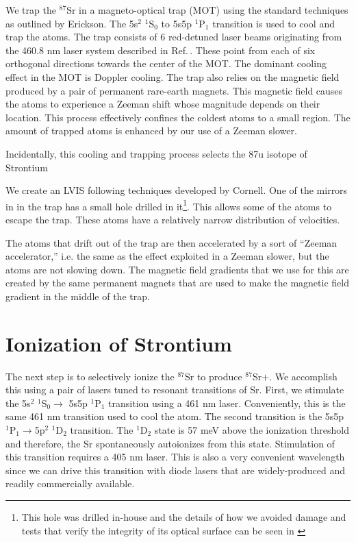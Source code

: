 We trap the $^{87}$Sr in a magneto-optical trap (MOT) using the standard techniques as outlined by Erickson\cite{cjeDiss}. 
The 5s$^2$ $^1$S$_0$ to 5s5p $^1$P$_1$ transition is used to cool and trap the atoms. 
The trap consists of 6 red-detuned laser beams originating from the 460.8 nm laser system described in Ref.\,\cite{cjeDiss}. These point from each of six orthogonal directions towards the center of the MOT. The dominant cooling effect in the MOT is Doppler cooling. 
The trap also relies on the magnetic field produced by a pair of permanent rare-earth magnets. This magnetic field causes the atoms to experience a Zeeman shift whose magnitude depends on their location. This process effectively confines the coldest atoms to a small region. The amount of trapped atoms is enhanced by our use of a Zeeman slower. 

Incidentally, this cooling and trapping process selects the 87u isotope of Strontium%

We create an LVIS \cite{cjeDiss} following techniques developed by Cornell\cite{LVIS}. One of the mirrors in in the trap has a small hole drilled in it\footnote{This hole was drilled in-house and the details of how we avoided damage and tests that verify the integrity of its optical surface can be seen in \cite{cjeDiss}}. This allows some of the atoms to escape the trap. These atoms have a relatively narrow distribution of velocities. %


The atoms that drift out of the trap are then accelerated by a sort of ``Zeeman accelerator,'' i.e. the same as the effect exploited in a Zeeman slower, but the atoms are not slowing down. The magnetic field gradients that we use for this are created by the same permanent magnets that are used to make the magnetic field gradient in the middle of the trap.

\section{Ionization of Strontium}
 
The next step is to selectively ionize the $^{87}$Sr to produce $^{87}$Sr$+$. We accomplish this using a pair of lasers tuned to resonant transitions of Sr. First, we stimulate the 5s$^2$ $^1$S$_0 \rightarrow$ 5s5p $^1$P$_1$ transition using a 461 nm laser. Conveniently, this is the same 461 nm transition used to cool the atom. The second transition is the 5s5p $^1$P$_1\rightarrow$5p$^2$ $^1$D$_2$ transition. The $^1$D$_2$ state is 57 meV above the ionization threshold \cite{NSFprop} and therefore, the Sr spontaneously autoionizes from this state. Stimulation of this transition requires a 405 nm laser. This is also a very convenient wavelength since we can drive this transition with diode lasers that are widely-produced and readily commercially available.


